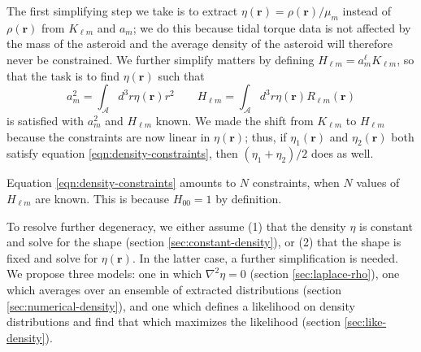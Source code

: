\documentclass{aastex631}
\begin{document}
The first simplifying step we take is to extract $\eta(\bm r) = \rho(\bm r) / \mu_m$ instead of $\rho(\bm r)$ from $K_{\ell m}$ and $a_m$; we do this because tidal torque data is not affected by the mass of the asteroid and the average density of the asteroid will therefore never be constrained. We further simplify matters by defining $H_{\ell m} = a_m^\ell K_{\ell m}$, so that the task is to find $\eta(\bm r)$ such that 
\begin{equation}
  a_m^2 = \int_{\mathcal{A}} d^3 r \eta(\bm r) r^2 \qquad H_{\ell m} = \int_{\mathcal{A}} d^3 r \eta(\bm r) R_{\ell m}(\bm r) 
  \label{eqn:density-constraints}
\end{equation}
is satisfied with $a_m^2$ and $H_{\ell m}$ known. We made the shift from $K_{\ell m}$ to $H_{\ell m}$ because the constraints are now linear in $\eta(\bm r)$; thus, if $\eta_1(\bm r)$ and $\eta_2(\bm r)$ both satisfy equation \ref{eqn:density-constraints}, then $(\eta_1 + \eta_2) / 2$ does as well.

Equation \ref{eqn:density-constraints} amounts to $N$ constraints, when $N$ values of $H_{\ell m}$ are known. This is because $H_{00} = 1$ by definition.

To resolve further degeneracy, we either assume (1) that the density $\eta$ is constant and solve for the shape (section \ref{sec:constant-density}), or (2) that the shape is fixed and solve for $\eta(\bm r)$. In the latter case, a further simplification is needed. We propose three models: one in which $\nabla^2 \eta = 0$ (section \ref{sec:laplace-rho}), one which averages over an ensemble of extracted distributions (section \ref{sec:numerical-density}), and one which defines a likelihood on density distributions and find that which maximizes the likelihood (section \ref{sec:like-density}).
\end{document}

